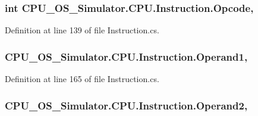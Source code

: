 \subsubsection[{Opcode}]{\setlength{\rightskip}{0pt plus 5cm}int C\+P\+U\+\_\+\+O\+S\+\_\+\+Simulator.\+C\+P\+U.\+Instruction.\+Opcode\hspace{0.3cm}{\ttfamily [get]}, {\ttfamily [set]}}\label{class_c_p_u___o_s___simulator_1_1_c_p_u_1_1_instruction_af56668feff9c8dab3c9335969a25e074}


Definition at line 139 of file Instruction.\+cs.

\hypertarget{class_c_p_u___o_s___simulator_1_1_c_p_u_1_1_instruction_a5eaf08ac611da1175f38f93defdee8d5}{}
\subsubsection[{Operand1}]{ C\+P\+U\+\_\+\+O\+S\+\_\+\+Simulator.\+C\+P\+U.\+Instruction.\+Operand1\hspace{0.3cm}{\ttfamily [get]}, {\ttfamily [set]}}\label{class_c_p_u___o_s___simulator_1_1_c_p_u_1_1_instruction_a5eaf08ac611da1175f38f93defdee8d5}


Definition at line 165 of file Instruction.\+cs.

\hypertarget{class_c_p_u___o_s___simulator_1_1_c_p_u_1_1_instruction_ab35e6667e7c2f42dd09965995e25ff2d}{}
\subsubsection[{Operand2}]{ C\+P\+U\+\_\+\+O\+S\+\_\+\+Simulator.\+C\+P\+U.\+Instruction.\+Operand2\hspace{0.3cm}{\ttfamily [get]}, {\ttfamily [set]}}\label{class_c_p_u___o_s___simulator_1_1_c_p_u_1_1_instruction_ab35e6667e7c2f42dd09965995e25ff2d}


